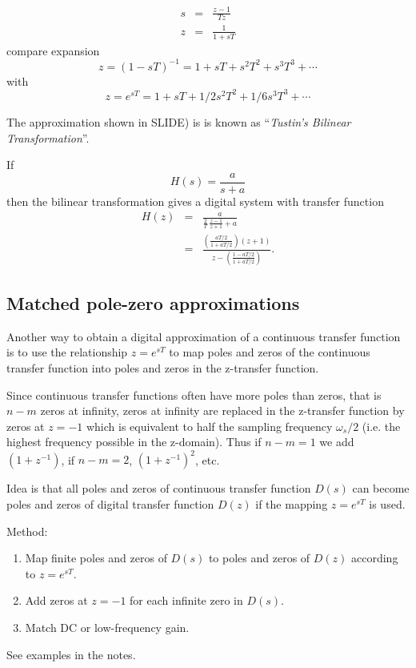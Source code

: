 \begin{slide}\label{slide:l11s21}
  
  \begin{eqnarray*}
     s &=& \frac{z-1}{Tz} \\
     z &=& \frac{1}{1 + sT}
  \end{eqnarray*}
  compare expansion $$z=(1-sT)^{-1} = 1 + sT + s^2T^2 + s^3T^3
 + \cdots$$  with $$z = e^{sT} = 1 + sT + 1/2 s^2T^2 + 1/6 s^3T^3 + \cdots$$
\end{slide}


The approximation shown in SLIDE) is
is known as ``\emph{Tustin's Bilinear Transformation}''.

\begin{slide}\label{slide:l11s23}
  If \[H(s) = \frac{a}{s+a}\] then the bilinear transformation gives a
  digital system with transfer function
  \begin{eqnarray*}
    H(z)&=& \frac{a}{\frac{2}{T}\,\frac{z-1}{z+1}+a} \\
        &=& \frac{\left(\frac{aT/2}{1+aT/2}\right)(z+1)}{z-\left(\frac{1-aT/2}{1+aT/2}\right)}.
  \end{eqnarray*}
\end{slide}

\subsection*{Matched pole-zero approximations}

Another way to obtain a digital approximation of a continuous transfer function is to use the relationship $z = e^{sT}$ to map poles and zeros of the continuous transfer function into poles and zeros in the z-transfer function. 

Since continuous transfer functions often have more poles than zeros, that is $n-m$ zeros at infinity, zeros at infinity are replaced in the z-transfer function by zeros at $z = -1$ which is equivalent to half the sampling frequency $\omega_s/2$ (i.e. the highest frequency possible in the z-domain). Thus if $n-m =1$ we add $(1+z^{-1})$, if $n-m=2$, $(1+z^{-1})^2$, etc. 

\begin{slide}\label{slides:l11s24}
	Idea is that all poles and zeros of continuous transfer function $D(s)$ can become poles and zeros of digital transfer function $D(z)$ if the mapping $z=e^{sT}$ is used.
	
	Method:
	\begin{enumerate}
		\item Map finite poles and zeros of $D(s)$ to poles and zeros of $D(z)$ according to $z=e^{sT}$.
		\item Add zeros at $z=-1$ for each infinite zero in $D(s)$.
		\item Match DC or low-frequency gain.
	\end{enumerate}
	See examples in the notes.
\end{slide}

